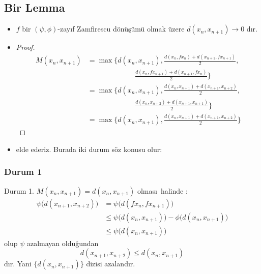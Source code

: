 \documentclass[8pt]{beamer}
\begin{document}
\subsection{Bir Lemma}
\begin{frame}
\begin{itemize}[<+-| alert@+>]  

  \item[] 
  \begin{lemma}
   $f$ bir $(\psi,\phi)$-zay\i f Zamfirescu d\"{o}n\"{u}\c{s}\"{u}m\"{u} olmak \"{u}zere $d(x_n,x_{n+1})\rightarrow 0$ d\i r.
  \end{lemma}

  \item[] 
    \begin{proof}
      \begin{align*}
          M(x_n,x_{n+1})&=\max\bigg\{
          d(x_n,x_{n+1}),\frac{d(x_n,fx_n)+d(x_{n+1},fx_{n+1})}{2},\\
          &\hspace{80pt} \frac{d(x_n,fx_{n+1})+d(x_{n+1},fx_{n})}{2} \bigg\}\\
          &=\max\bigg\{
          d(x_n,x_{n+1}),\frac{d(x_n,x_{n+1})+d(x_{n+1},x_{n+2})}{2},\\
          &\hspace{80pt} \frac{d(x_n,x_{n+2})+d(x_{n+1},x_{n+1})}{2} \bigg\}\\
          &=\max\bigg\{
          d(x_n,x_{n+1}),\frac{d(x_n,x_{n+1})+d(x_{n+1},x_{n+2})}{2}\bigg\}
      \end{align*}
    \end{proof}

  \item[] elde ederiz. Burada iki durum s\"oz konusu olur:
\end{itemize}
\end{frame}%

\subsubsection{Durum 1}
\begin{frame}
  \begin{block}{Durum 1. $M(x_n,x_{n+1})=d(x_n,x_{n+1})$ olmas\i\ halinde :}
      \begin{align*}
          \psi\big(d(x_{n+1},x_{n+2})\big)&=\psi \big(d(fx_{n},fx_{n+1})\big)\\
          &\leq \psi\big(d(x_{n},x_{n+1})\big)- \phi\big(d(x_{n},x_{n+1})\big)\\
          &\leq \psi\big(d(x_{n},x_{n+1})\big)
      \end{align*}
olup $\psi$ azalmayan oldu\u{g}undan $$d(x_{n+1},x_{n+2})\leq d(x_n,x_{n+1})$$ d\i r. Yani $\{d(x_n,x_{n+1})\}$ dizisi azaland\i r.
   \end{block}
\end{frame}%
\end{document}
